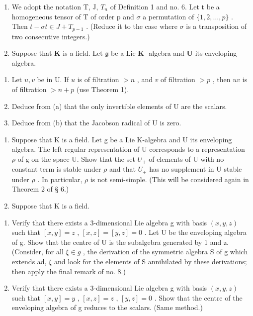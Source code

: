 
\begin{enumerate}
\def\labelenumi{\arabic{enumi}.}
\item
  We adopt the notation T, J, \(T_{n}\) of Definition 1 and no. 6. Let t be a homogeneous tensor of T of order p and \(\sigma\) a permutation of \(\{1, 2, \ldots, p\}\) . Then \(t - \sigma t \in J + T_{p-1}\) . (Reduce it to the case where \(\sigma\) is a transposition of two consecutive integers.)
\item
  Suppose that \(\mathbf{K}\) is a field. Let \(\mathfrak{g}\) be a Lie \(\mathbf{K}\) -algebra and \(\mathbf{U}\) its enveloping algebra.
\end{enumerate}

\begin{enumerate}
\def\labelenumi{(\alph{enumi})}
\item
  Let \(u, v\) be in U. If \(u\) is of filtration \(> n\) , and \(v\) of filtration \(> p\) , then \(uv\) is of filtration \(> n + p\) (use Theorem 1).
\item
  Deduce from (a) that the only invertible elements of U are the scalars.
\item
  Deduce from (b) that the Jacobson radical of U is zero.
\end{enumerate}

\begin{enumerate}
\def\labelenumi{\arabic{enumi}.}
\setcounter{enumi}{2}
\item
  Suppose that K is a field. Let g be a Lie K-algebra and U its enveloping algebra. The left regular representation of U corresponds to a representation \(\rho\) of g on the space U. Show that the set \(U_{+}\) of elements of U with no constant term is stable under \(\rho\) and that \(U_{+}\) has no supplement in U stable under \(\rho\) . In particular, \(\rho\) is not semi-simple. (This will be considered again in Theorem 2 of § 6.)
\item
  Suppose that K is a field.
\end{enumerate}

\begin{enumerate}
\def\labelenumi{(\alph{enumi})}
\item
  Verify that there exists a 3-dimensional Lie algebra g with basis \((x, y, z)\) such that \([x, y] = z\) , \([x, z] = [y, z] = 0\) . Let U be the enveloping algebra of g. Show that the centre of U is the subalgebra generated by 1 and z. (Consider, for all \(\xi \in g\) , the derivation of the symmetric algebra S of g which extends ad, \(\xi\) and look for the elements of S annihilated by these derivations; then apply the final remark of no. 8.)
\item
  Verify that there exists a 3-dimensional Lie algebra g with basis \((x, y, z)\) such that \([x, y] = y\) , \([x, z] = z\) , \([y, z] = 0\) . Show that the centre of the enveloping algebra of g reduces to the scalars. (Same method.)
\end{enumerate}

